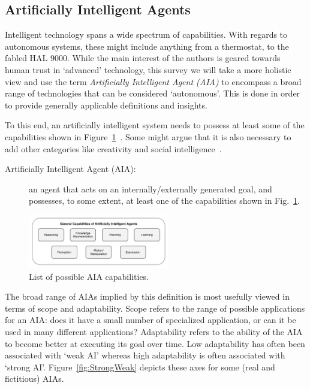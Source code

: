 \subsection{Artificially Intelligent Agents} \label{sec:aias}
    Intelligent technology spans a wide spectrum of capabilities. With regards to autonomous systems, these might include anything from a thermostat, to the fabled HAL 9000. While the main interest of the authors is geared towards human trust in `advanced' technology, this survey we will take a more holistic view and use the term \textit{Artificially Intelligent Agent (AIA)} to encompass a broad range of technologies that can be considered `autonomous'. This is done in order to provide generally applicable definitions and insights. 

    To this end, an artificially intelligent system needs to possess at least some of the capabilities shown in Figure~\ref{fig:AIcapabilities}~\cite{Russell2010-wv,Nilsson2009-rp,Luger2008-vf}. Some might argue that it is also necessary to add other categories like creativity and social intelligence~\cite{Tao2005-kh}. 
    \begin{description}
        \item[Artificially Intelligent Agent (AIA):] an agent that acts on an internally/externally generated goal, and possesses, to some extent, at least one of the capabilities shown in Fig.~\ref{fig:AIcapabilities}.
    \end{description}

	\begin{figure}[htbp]
    	\centering
     	\includegraphics[width=0.55\textwidth]{Figures/AI_capabilities}
    	\caption{List of possible AIA capabilities.}
        \label{fig:AIcapabilities}
    \end{figure}

    The broad range of AIAs implied by this definition is most usefully viewed in terms of scope and adaptability. Scope refers to the range of possible applications for an AIA: does it have a small number of specialized application, or can it be used in many different applications? Adaptability refers to the ability of the AIA to become better at executing its goal over time. Low adaptability has often been associated with `weak AI' whereas high adaptability is often associated with `strong AI'.  Figure~\ref{fig:StrongWeak} depicts these axes for some (real and fictitious) AIAs.

